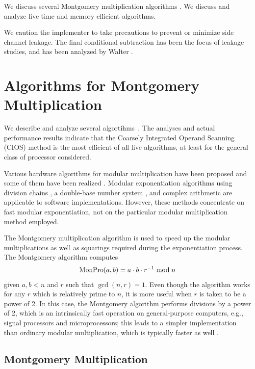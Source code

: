 \documentclass[twocolumn]{svjour3}          %
\begin{document}
We discuss several Montgomery multiplication algorithms
\cite{M85:Modular}.  We discuss and analyze five time and memory
efficient algorithms.

We caution the implementer to take precautions to prevent or minimize
side channel leakage. The final conditional subtraction has been the focus
of leakage studies, and has been analyzed by Walter \cite{W08:Leakage}.

\section{Algorithms for Montgomery Multiplication}

We describe and analyze several algortihms~\cite{KAK96:Analyzing}. The
analyses and actual performance results indicate that the Coarsely
Integrated Operand Scanning (CIOS) method is the most efficient of all
five algorithms, at least for the general class of processor
considered.

Various hardware algorithms for modular multiplication have been
proposed and some of them have been realized
\cite{B89:A,T91:A,OK91:A}.  Modular exponentiation algorithms using
division chains \cite{W97:Exponentiation}, a double-base number system
\cite{DJM97:Theory}, and complex arithmetic \cite{DJM97:Algorithms}
are applicable to software implementations. However, these methods
concentrate on fast modular exponentiation, not on the particular
modular multiplication method employed.

The Montgomery multiplication algorithm is used to speed up the
modular multiplications as well as squarings required during the
exponentiation process. The Montgomery algorithm computes
%
\begin{equation}
\mbox{MonPro}(a,b)=a \cdot b \cdot r^{-1} \bmod{n}
\label{monpro1}
\end{equation}
%
given $a,b<n$ and $r$ such that $\gcd(n,r)=1$. Even though the
algorithm works for any $r$ which is relatively prime to $n$, it is
more useful when $r$ is taken to be a power of 2. In this case, the
Montgomery algorithm performs divisions by a power of 2, which is an
intrinsically fast operation on general-purpose computers, e.g.,
signal processors and microprocessors; this leads to a simpler
implementation than ordinary modular multiplication, which is
typically faster as well \cite{NMR95:Can}.

\subsection{Montgomery Multiplication}
\end{document}
